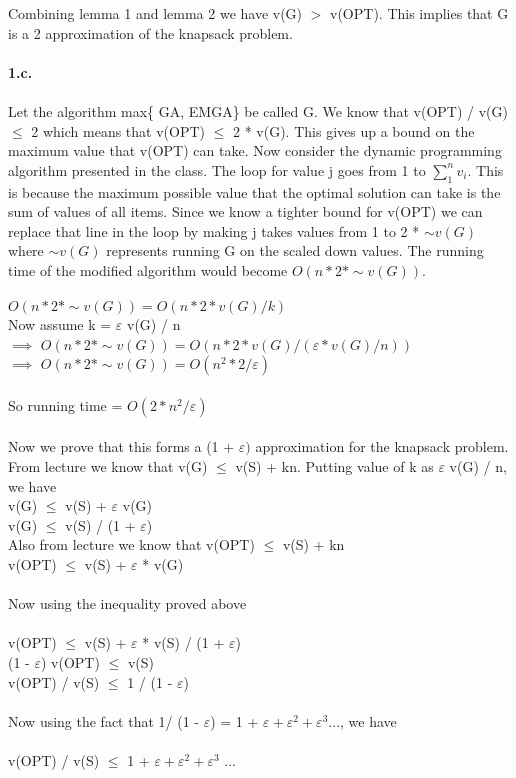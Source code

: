 \documentclass[11pt]{article}
\newcommand*\Let[2]{\State #1 $\gets$ #2}
\begin{document}
Combining lemma 1 and lemma 2 we have v(G) $>$ v(OPT). This implies that G is a 2 approximation of the knapsack problem.\\\\
{\bf 1.c.} \\\\Let the algorithm max\{ GA, EMGA\} be called G. We know that v(OPT) / v(G) $\leq$ 2 which means that v(OPT) $\leq$ 2 * v(G). This gives up a bound on the maximum value that v(OPT) can take. Now consider the dynamic programming algorithm presented in the class. The loop for value j goes from 1 to $\sum\limits_{1}^n v_i$. This is because the maximum possible value that the optimal solution can take is the sum of values of all items.  Since we know a tighter bound for v(OPT) we can replace that line in the loop by making j takes values from 1 to 2 * $\sim {v(G)}$ where $\sim v(G)$ represents running G on the scaled down values. The running time of the modified algorithm would become $O( n * 2 * \sim v(G))$. \\\\
$O( n * 2 * \sim v(G)) = O( n * 2 * v(G) / k)$\\
Now assume k = $\varepsilon$ v(G) / n\\
$\implies$  $O( n * 2 * \sim v(G)) = O( n * 2 * v(G) / ( \varepsilon * v(G) / n ))$\\
$\implies$  $O( n * 2 * \sim v(G)) = O( n^2 * 2 / \varepsilon)$\\\\
So running time  = $O( 2 * n^2 / \varepsilon)$\\\\
Now we prove that this forms a (1 + $\varepsilon)$ approximation for the knapsack problem. From lecture we know that v(G) $\leq$ v(S) + kn. Putting value of k as $\varepsilon$ v(G) / n, we have\\
v(G) $\leq$ v(S) + $\varepsilon$ v(G)\\
v(G) $\leq$ v(S) / (1 + $\varepsilon$)\\

Also from lecture we know that v(OPT) $\leq$ v(S) + kn\\
v(OPT) $\leq$ v(S) + $\varepsilon$ * v(G)\\\\
Now using the inequality proved above\\\\
v(OPT) $\leq$ v(S) + $\varepsilon$ * v(S) / (1 + $\varepsilon$)\\
(1 - $\varepsilon$) v(OPT) $\leq$ v(S)\\
v(OPT) / v(S) $\leq$ 1 / (1 - $\varepsilon$)\\\\
Now using the fact that 1/ (1 - $\varepsilon$) = 1 + $\varepsilon + \varepsilon^2 + \varepsilon^3 ... $, we have \\\\
v(OPT) / v(S) $\leq$ 1 + $\varepsilon + \varepsilon^2 + \varepsilon^3$ ...
\end{document}
